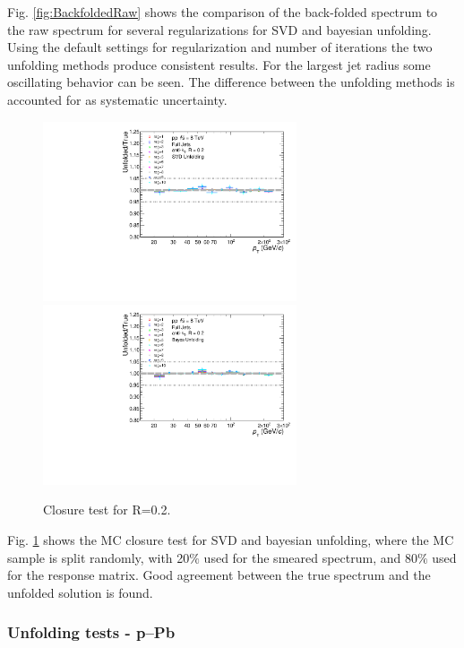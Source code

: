 \documentclass[ALICE]{ALICE_analysis_notes}
\newcommand{\pPb}{{\mbox{p--Pb}}\xspace}
\begin{document}
Fig. \ref{fig:BackfoldedRaw} shows the comparison of the back-folded spectrum to the raw spectrum for several regularizations for SVD and bayesian unfolding. Using the default settings for regularization and number of iterations the two unfolding methods produce consistent results. For the largest jet radius some oscillating behavior can be seen. The difference between the unfolding methods is accounted for as systematic uncertainty.

\begin{figure}
    \centering
    \begin{multicols}{2}
            \includegraphics[width=7.5cm]{figures/UnfoldingComparisons/Closure/RatioClosure1DSvd_R02.pdf}
        \vfill\null
        \columnbreak
            \includegraphics[width=7.5cm]{figures/UnfoldingComparisons/Closure/RatioClosure1DBayes_R02.pdf}
        \vfill\null
    \end{multicols}
    \caption{Closure test for R=0.2.}
    \label{fig:Closure}
\end{figure}

Fig. \ref{fig:Closure} shows the MC closure test for SVD and bayesian unfolding, where the MC sample is split randomly, with 20$\%$ used for the smeared spectrum, and 80$\%$ used for the response matrix. Good agreement between the true spectrum and the unfolded solution is found.

\subsubsection{Unfolding tests - \pPb}
\end{document}
